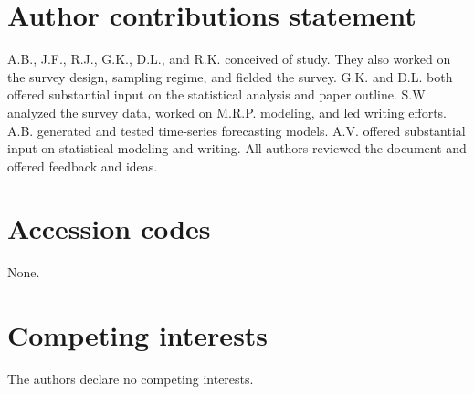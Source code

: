 \documentclass[fleqn,10pt]{wlscirep}
\begin{document}
\section*{Author contributions statement}

A.B., J.F., R.J., G.K., D.L., and R.K. conceived of study. They also worked on the survey design, sampling regime, and fielded the survey. G.K. and D.L. both offered substantial input on the statistical analysis and paper outline. S.W. analyzed the survey data, worked on M.R.P. modeling, and led writing efforts. A.B. generated and tested time-series forecasting models. A.V. offered substantial input on statistical modeling and writing. All authors reviewed the document and offered feedback and ideas.

\section*{Accession codes}
None.

\section*{Competing interests}

The authors declare no competing interests.
\end{document}
